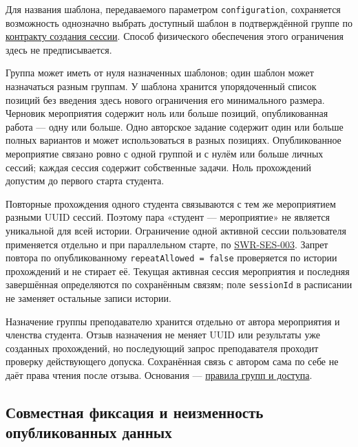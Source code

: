 \documentclass[12pt,a4paper]{article}
\begin{document}
Для названия шаблона, передаваемого параметром \texttt{configuration}, сохраняется возможность однозначно выбрать доступный шаблон в подтверждённой группе по {\href{../09\_Архитектура\_и\_API/DOC-08\_Справочник\_API.pdf\#1-создание-сессии}{контракту создания сессии}}. Способ физического обеспечения этого ограничения здесь не предписывается.

Группа может иметь от нуля назначенных шаблонов; один шаблон может назначаться разным группам. У шаблона хранится упорядоченный список позиций без введения здесь нового ограничения его минимального размера. Черновик мероприятия содержит ноль или больше позиций, опубликованная работа --- одну или больше. Одно авторское задание содержит один или больше полных вариантов и может использоваться в разных позициях. Опубликованное мероприятие связано ровно с одной группой и с нулём или больше личных сессий; каждая сессия содержит собственные задачи. Ноль прохождений допустим до первого старта студента.

Повторные прохождения одного студента связываются с тем же мероприятием разными UUID сессий. Поэтому пара «студент --- мероприятие» не является уникальной для всей истории. Ограничение одной активной сессии пользователя применяется отдельно и при параллельном старте, по {\href{DOC-06.2\_Сессии\_задач\_и\_планировщик.pdf\#swr-ses-003}{SWR-SES-003}}. Запрет повтора по опубликованному \texttt{repeat\allowbreak{}Allowed =\allowbreak{} false} проверяется по истории прохождений и не стирает её. Текущая активная сессия мероприятия и последняя завершённая определяются по сохранённым связям; поле \texttt{sessionId} в расписании не заменяет остальные записи истории.

Назначение группы преподавателю хранится отдельно от автора мероприятия и членства студента. Отзыв назначения не меняет UUID или результаты уже созданных прохождений, но последующий запрос преподавателя проходит проверку действующего допуска. Сохранённая связь с автором сама по себе не даёт права чтения после отзыва. Основания --- {\href{../02\_Техническое\_задание/DOC-02\_Техническое\_задание.pdf\#правила-доступа-и-прохождения-контрольного-мероприятия}{правила групп и доступа}}.

\subsection{Совместная фиксация и неизменность опубликованных данных}\label{ux441ux43eux432ux43cux435ux441ux442ux43dux430ux44f-ux444ux438ux43aux441ux430ux446ux438ux44f-ux438-ux43dux435ux438ux437ux43cux435ux43dux43dux43eux441ux442ux44c-ux43eux43fux443ux431ux43bux438ux43aux43eux432ux430ux43dux43dux44bux445-ux434ux430ux43dux43dux44bux445}
\end{document}
